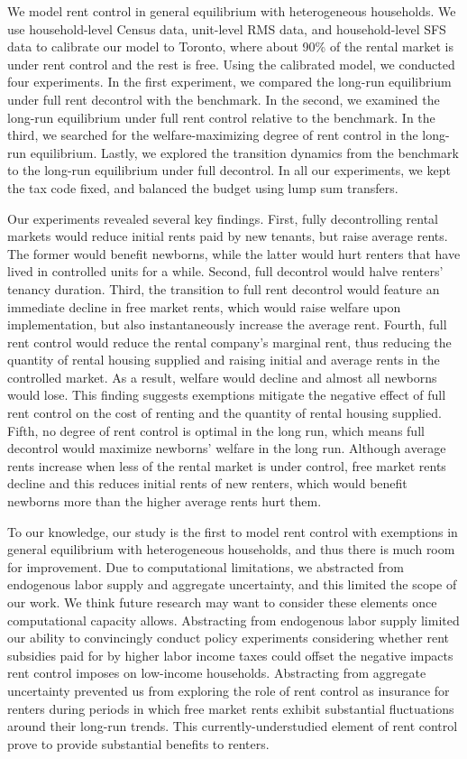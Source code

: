 \documentclass[parskip=full]{article}
\begin{document}
We model rent control in general equilibrium with heterogeneous households. We use household-level Census data, unit-level RMS data, and household-level SFS data to calibrate our model to Toronto, where about 90\% of the rental market is under rent control and the rest is free. Using the calibrated model, we conducted four experiments. In the first experiment, we compared the long-run equilibrium under full rent decontrol with the benchmark. In the second, we examined the long-run equilibrium under full rent control relative to the benchmark. In the third, we searched for the welfare-maximizing degree of rent control in the long-run equilibrium. Lastly, we explored the transition dynamics from the benchmark to the long-run equilibrium under full decontrol. In all our experiments, we kept the tax code fixed, and balanced the budget using lump sum transfers.

Our experiments revealed several key findings. First, fully decontrolling rental markets would reduce initial rents paid by new tenants, but raise average rents. The former would benefit newborns, while the latter would hurt renters that have lived in controlled units for a while. Second, full decontrol would halve renters' tenancy duration. Third, the transition to full rent decontrol would feature an immediate decline in free market rents, which would raise welfare upon implementation, but also instantaneously increase the average rent. Fourth, full rent control would reduce the rental company's marginal rent, thus reducing the quantity of rental housing supplied and raising initial and average rents in the controlled market. As a result, welfare would decline and almost all newborns would lose. This finding suggests exemptions mitigate the negative effect of full rent control on the cost of renting and the quantity of rental housing supplied. Fifth, no degree of rent control is optimal in the long run, which means full decontrol would maximize newborns' welfare in the long run. Although average rents increase when less of the rental market is under control, free market rents decline and this reduces initial rents of new renters, which would benefit newborns more than the higher average rents hurt them.

To our knowledge, our study is the first to model rent control with exemptions in general equilibrium with heterogeneous households, and thus there is much room for improvement. Due to computational limitations, we abstracted from endogenous labor supply and aggregate uncertainty, and this limited the scope of our work. We think future research may want to consider these elements once computational capacity allows. Abstracting from endogenous labor supply limited our ability to convincingly conduct policy experiments considering whether rent subsidies paid for by higher labor income taxes could offset the negative impacts rent control imposes on low-income households. Abstracting from aggregate uncertainty prevented us from exploring the role of rent control as insurance for renters during periods in which free market rents exhibit substantial fluctuations around their long-run trends. This currently-understudied element of rent control prove to provide substantial benefits to renters.
\end{document}
